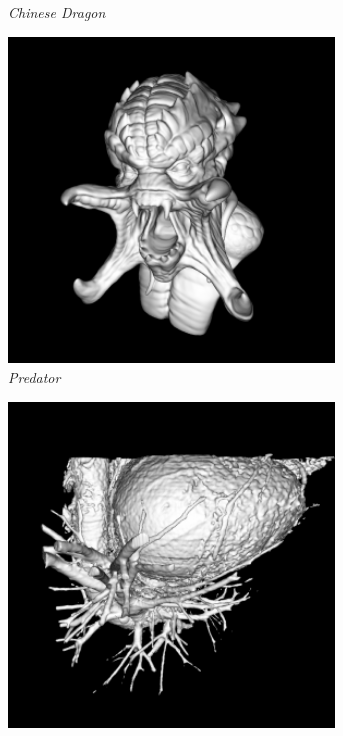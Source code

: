 \documentclass[crop=false]{standalone}
\begin{document}
\begin{figure}[h]
\begin{subfigure}[b]{0.24\textwidth}
          \caption{\textit{Chinese Dragon}}
        \end{subfigure}
        \begin{subfigure}[b]{0.24\textwidth}
          \center
          \includegraphics[width=0.95\textwidth]{images/predator.png}
          \caption{\textit{Predator}}
        \end{subfigure}
        \begin{subfigure}[b]{0.24\textwidth}
          \center
          \includegraphics[width=0.95\textwidth]{images/half_heart.png}

\end{subfigure}
\end{figure}
\end{document}
